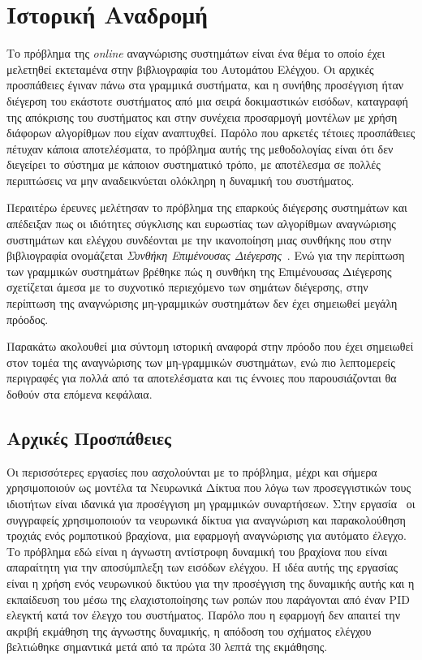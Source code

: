 \section{Ιστορική Αναδρομή}
Το πρόβλημα της \textit{online} αναγνώρισης συστημάτων είναι ένα θέμα το οποίο έχει μελετηθεί εκτεταμένα στην βιβλιογραφία του Αυτομάτου Ελέγχου. Οι αρχικές προσπάθειες έγιναν πάνω στα γραμμικά συστήματα, και η συνήθης προσέγγιση ήταν διέγερση του εκάστοτε συστήματος από μια σειρά δοκιμαστικών εισόδων, καταγραφή της απόκρισης του συστήματος και στην συνέχεια προσαρμογή μοντέλων με χρήση διάφορων αλγορίθμων που είχαν αναπτυχθεί. Παρόλο που αρκετές τέτοιες προσπάθειες πέτυχαν κάποια αποτελέσματα, το πρόβλημα αυτής της μεθοδολογίας είναι ότι δεν διεγείρει το σύστημα με κάποιον συστηματικό τρόπο, με αποτέλεσμα σε πολλές περιπτώσεις να μην αναδεικνύεται ολόκληρη η δυναμική του συστήματος.

Περαιτέρω έρευνες μελέτησαν το πρόβλημα της επαρκούς διέγερσης συστημάτων και απέδειξαν πως οι ιδιότητες σύγκλισης και ευρωστίας των αλγορίθμων αναγνώρισης συστημάτων και ελέγχου συνδέονται με την ικανοποίηση μιας συνθήκης που στην βιβλιογραφία ονομάζεται \textit{Συνθήκη Επιμένουσας Διέγερσης}~\cite{green1985persistence}. Ενώ για την περίπτωση των γραμμικών συστημάτων βρέθηκε πώς η συνθήκη της Επιμένουσας Διέγερσης σχετίζεται άμεσα με το συχνοτικό περιεχόμενο των σημάτων διέγερσης, στην περίπτωση της αναγνώρισης μη-γραμμικών συστημάτων δεν έχει σημειωθεί μεγάλη πρόοδος.


Παρακάτω ακολουθεί μια σύντομη ιστορική αναφορά στην πρόοδο που έχει σημειωθεί στον τομέα της αναγνώρισης των μη-γραμμικών συστημάτων, ενώ πιο λεπτομερείς περιγραφές για πολλά από τα αποτελέσματα και τις έννοιες που παρουσιάζονται θα δοθούν στα επόμενα κεφάλαια.

\subsection{Αρχικές Προσπάθειες}
Οι περισσότερες εργασίες που ασχολούνται με το πρόβλημα, μέχρι και σήμερα χρησιμοποιούν ως μοντέλα τα Νευρωνικά Δίκτυα που λόγω των προσεγγιστικών τους ιδιοτήτων είναι ιδανικά για προσέγγιση μη γραμμικών συναρτήσεων. Στην εργασία~\cite{miyamoto1988feedback} οι συγγραφείς χρησιμοποιούν τα νευρωνικά δίκτυα για αναγνώριση και παρακολούθηση τροχιάς ενός ρομποτικού βραχίονα, μια εφαρμογή αναγνώρισης για αυτόματο έλεγχο. Το πρόβλημα εδώ είναι η άγνωστη αντίστροφη δυναμική του βραχίονα που είναι απαραίτητη για την αποσύμπλεξη των εισόδων ελέγχου. Η ιδέα αυτής της εργασίας είναι η χρήση ενός νευρωνικού δικτύου για την προσέγγιση της δυναμικής αυτής και η εκπαίδευση του μέσω της ελαχιστοποίησης των ροπών που παράγονται από έναν PID ελεγκτή κατά τον έλεγχο του συστήματος. Παρόλο που η εφαρμογή δεν απαιτεί την ακριβή εκμάθηση της άγνωστης δυναμικής, η απόδοση του σχήματος ελέγχου βελτιώθηκε σημαντικά μετά από τα πρώτα 30 λεπτά της εκμάθησης.

